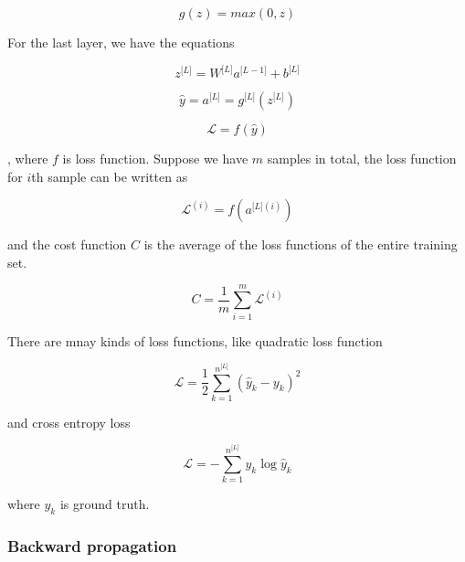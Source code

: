 \documentclass[11pt]{scrartcl} %
\begin{document}
\begin{equation}
g(z)=max(0,z)
\end{equation}

For the last layer, we have the equations

\begin{equation}
z^{\lbrack L\rbrack}=W^{\lbrack L\rbrack}a^{\lbrack L-1\rbrack}+b^{\lbrack L\rbrack}
\end{equation}

\begin{equation}
\widehat y=a^{\lbrack L\rbrack}=g^{\lbrack L\rbrack}(z^{\lbrack L\rbrack})
\end{equation}


\begin{equation}
\mathcal L=f(\widehat y)
\end{equation}

, where $f$ is loss function. Suppose we have $m$ samples in total, the loss function for $i$th sample can be written as 

\begin{equation}
\mathcal L^{(i)}=f(a^{\lbrack L\rbrack(i)})
\end{equation}

and the cost function $C$ is the average of the loss functions of the entire training set.

\begin{equation}
C=\frac1m\sum_{i=1}^m\mathcal L^{(i)}
\label{fp3}
\end{equation}

There are mnay kinds of loss functions, like quadratic loss function

\begin{equation}
\mathcal L=\frac12\sum_{k=1}^{n^{\lbrack L\rbrack}}(\widehat y_k-y_k)^{2}
\end{equation}

and cross entropy loss

\begin{equation}
\mathcal L=-\sum_{k=1}^{n^{\lbrack L\rbrack}}y_k\log{\widehat y}_k
\end{equation}

where $y_k$ is ground truth.


\subsubsection{Backward propagation}
\end{document}
